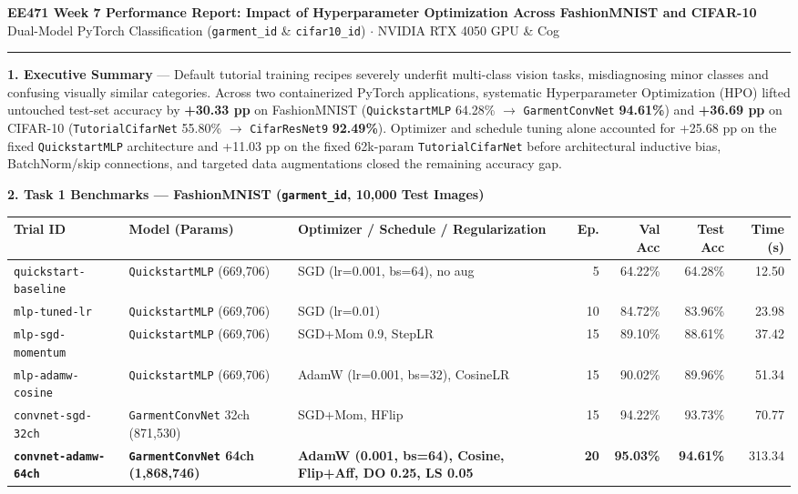 \documentclass[10pt,a4paper]{article}
\begin{document}
\begin{center}
{\large \textbf{EE471 Week 7 Performance Report: Impact of Hyperparameter Optimization Across FashionMNIST and CIFAR-10}}\\[2pt]
{\small \textcolor{muted}{Dual-Model PyTorch Classification (\texttt{garment\_id} \& \texttt{cifar10\_id}) $\cdot$ NVIDIA RTX 4050 GPU \& Cog}}
\end{center}
\vspace{-4pt}
\hrule
\vspace{6pt}

\textbf{\textcolor{accent}{1. Executive Summary}} ---
Default tutorial training recipes severely underfit multi-class vision tasks, misdiagnosing minor classes and confusing visually similar categories. Across two containerized PyTorch applications, systematic Hyperparameter Optimization (HPO) lifted untouched test-set accuracy by \textbf{+30.33 pp} on FashionMNIST (\texttt{QuickstartMLP} 64.28\% $\rightarrow$ \texttt{GarmentConvNet} \textbf{94.61\%}) and \textbf{+36.69 pp} on CIFAR-10 (\texttt{TutorialCifarNet} 55.80\% $\rightarrow$ \texttt{CifarResNet9} \textbf{92.49\%}). Optimizer and schedule tuning alone accounted for +25.68 pp on the fixed \texttt{QuickstartMLP} architecture and +11.03 pp on the fixed 62k-param \texttt{TutorialCifarNet} before architectural inductive bias, BatchNorm/skip connections, and targeted data augmentations closed the remaining accuracy gap.

\vspace{4pt}
\textbf{\textcolor{accent}{2. Task 1 Benchmarks --- FashionMNIST (\texttt{garment\_id}, 10,000 Test Images)}}
\vspace{2pt}

{\scriptsize
\setlength{\tabcolsep}{4pt}
\begin{tabularx}{\textwidth}{@{}l l >{\raggedright\arraybackslash}X r r r r@{}}
\toprule
\textbf{Trial ID} & \textbf{Model (Params)} & \textbf{Optimizer / Schedule / Regularization} & \textbf{Ep.} & \textbf{Val Acc} & \textbf{Test Acc} & \textbf{Time (s)} \\
\midrule
\texttt{quickstart-baseline} & \texttt{QuickstartMLP} (669,706) & SGD (lr=0.001, bs=64), no aug & 5 & 64.22\% & 64.28\% & 12.50 \\
\texttt{mlp-tuned-lr} & \texttt{QuickstartMLP} (669,706) & SGD (lr=0.01) & 10 & 84.72\% & 83.96\% & 23.98 \\
\texttt{mlp-sgd-momentum} & \texttt{QuickstartMLP} (669,706) & SGD+Mom 0.9, StepLR & 15 & 89.10\% & 88.61\% & 37.42 \\
\texttt{mlp-adamw-cosine} & \texttt{QuickstartMLP} (669,706) & AdamW (lr=0.001, bs=32), CosineLR & 15 & 90.02\% & 89.96\% & 51.34 \\
\texttt{convnet-sgd-32ch} & \texttt{GarmentConvNet} 32ch (871,530) & SGD+Mom, HFlip & 15 & 94.22\% & 93.73\% & 70.77 \\
\textbf{\texttt{convnet-adamw-64ch}} & \textbf{\texttt{GarmentConvNet} 64ch (1,868,746)} & \textbf{AdamW (0.001, bs=64), Cosine, Flip+Aff, DO 0.25, LS 0.05} & \textbf{20} & \textbf{95.03\%} & \textbf{94.61\%} & 313.34 \\
\bottomrule
\end{tabularx}
}
\end{document}
